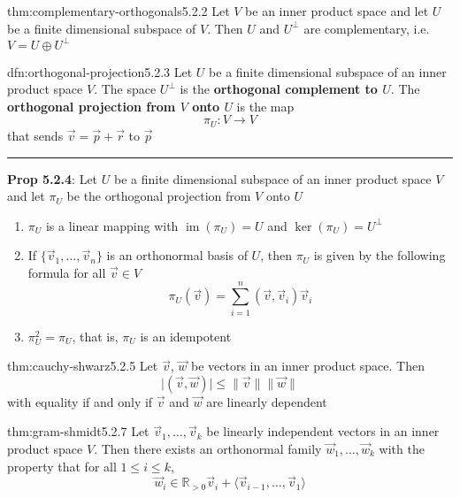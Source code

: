 \documentclass[landscape, 8pt]{extarticle}
\DeclareMathOperator{\im}{im}
\begin{document}
\begin{multicols}{3}
\begin{thm}{thm:complementary-orthogonals}{5.2.2}
    Let $V$ be an inner product space and let $U$ be a finite dimensional subspace of $V$. Then $U$ and $U^{\bot}$ are complementary, i.e. $V = U \oplus U^{\bot}$
\end{thm}

\begin{dfn}{dfn:orthogonal-projection}{5.2.3}
    Let $U$ be a finite dimensional subspace of an inner product space $V$. The space $U^{\bot}$ is the \textbf{orthogonal complement to $U$}. The \textbf{orthogonal projection from $V$ onto $U$} is the map
    \[\pi_{U} : V \to V\]
    that sends $\vec{v} = \vec{p} + \vec{r}$ to $\vec{p}$

    \noindent\rule{\textwidth}{0.2pt}
    \textbf{Prop 5.2.4}: Let $U$ be a finite dimensional subspace of an inner product space $V$ and let $\pi_{U}$ be the orthogonal projection from $V$ onto $U$
    \begin{enumerate}
        \setlength\itemsep{0em}
        \item $\pi_{U}$ is a linear mapping with $\im(\pi_{U}) = U$ and $\ker (\pi_{U}) = U^{\bot}$
        \item If $\{\vec{v}_{1},\dots,\vec{v}_{n}\}$ is an orthonormal basis of $U$, then $\pi_{U}$ is given by the following formula for all $\vec{v}\in V$
            \[\pi_{U}(\vec{v}) = \sum_{i = 1}^{n} (\vec{v}, \vec{v}_{i}) \vec{v}_{i}\]
        \item $\pi_{U}^{2} = \pi_{U}$, that is, $\pi_{U}$ is an idempotent
    \end{enumerate}
\end{dfn}

\begin{thm}{thm:cauchy-shwarz}{5.2.5}
    Let $\vec{v}$, $\vec{w}$ be vectors in an inner product space. Then
    \[\lvert (\vec{v}, \vec{w}) \rvert \le \lVert \vec{v} \rVert \lVert \vec{w} \rVert\]
    with equality if and only if $\vec{v}$ and $\vec{w}$ are linearly dependent
\end{thm}

\begin{thm}{thm:gram-shmidt}{5.2.7}
    Let $\vec{v}_{1},\dots,\vec{v}_{k}$ be linearly independent vectors in an inner product space $V$. Then there exists an orthonormal family $\vec{w}_{1},\dots,\vec{w}_{k}$ with the property that for all $1 \le i \le k$,
    \[\vec{w}_{i} \in \mathbb{R}_{>0} \vec{v}_{i} + \langle \vec{v}_{i - 1},\dots,\vec{v}_{1} \rangle\]


\end{thm}
\end{multicols}
\end{document}
